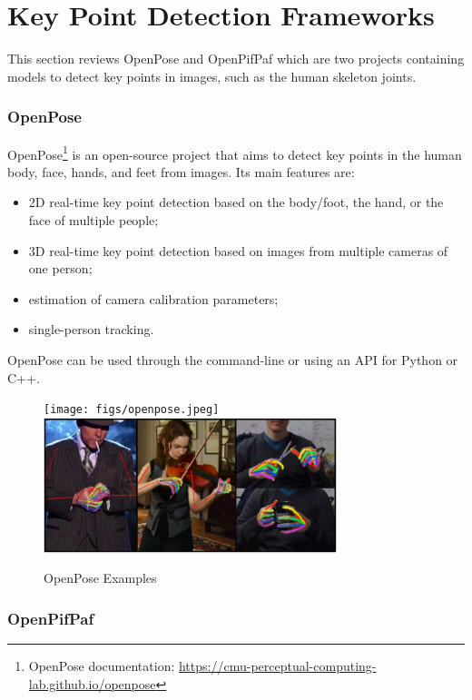 \section{Key Point Detection Frameworks}
\label{section:keypointdetection}

This section reviews OpenPose and OpenPifPaf which are two projects containing models to detect key points in images, such as the human skeleton joints.

\subsubsection{OpenPose}

OpenPose\cite{Cao2021,Simon2017,Cao2018,Wei2016}\footnote{OpenPose documentation: \url{https://cmu-perceptual-computing-lab.github.io/openpose}} is an open-source project that aims to detect key points in the human body, face, hands, and feet from images. Its main features are:

\begin{itemize}
    \item 2D real-time key point detection based on the body/foot, the hand, or the face of multiple people;
    \item 3D real-time key point detection based on images from multiple cameras of one person;
    \item estimation of camera calibration parameters;
    \item single-person tracking.
\end{itemize}

OpenPose can be used through the command-line or using an API for Python or C++.

\begin{figure}[h]
\centerline{\texttt{[image: figs/openpose.jpeg]}\includegraphics[height=1.55in]{figs/openpose2.PNG}}
\caption[OpenPose Examples]{OpenPose Examples \cite{Cao2021,Simon2017}}
\label{openpose}
\end{figure}

\subsubsection{OpenPifPaf}

